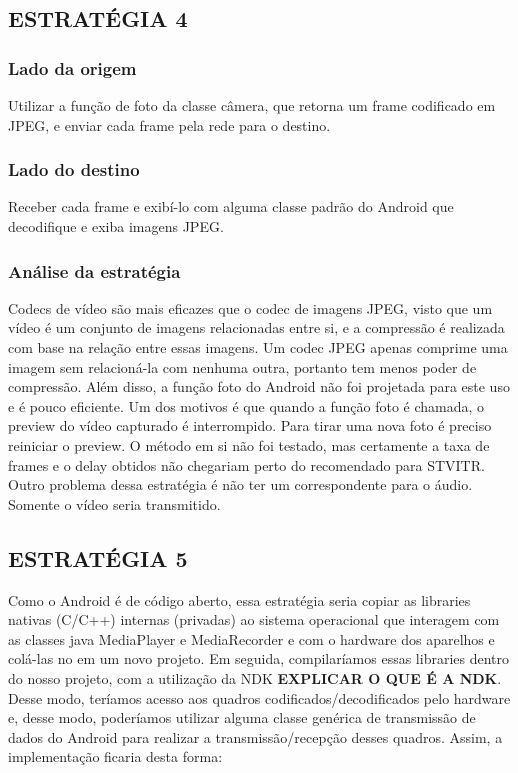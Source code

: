 \documentclass{acm_proc_article-sp}
\newcommand{\todo}[1]{\textcolor[rgb]{1.00,0.00,0.00}{\bf \uppercase{#1}}}
\begin{document}
\subsection{ESTRATÉGIA 4}

\subsubsection{Lado da origem}

Utilizar a função de foto da classe câmera, que retorna um frame codificado em JPEG, e enviar cada frame pela rede para o destino.

\subsubsection{Lado do destino}

Receber cada frame e exibí-lo com alguma classe padrão do Android que decodifique e exiba imagens JPEG.

\subsubsection{Análise da estratégia}

Codecs de vídeo são mais eficazes que o codec de imagens JPEG, visto que um vídeo é um conjunto de imagens relacionadas entre si, e a compressão é realizada com base na relação entre essas imagens. Um codec JPEG apenas comprime uma imagem sem relacioná-la com nenhuma outra, portanto tem menos poder de compressão. Além disso, a função foto do Android não foi projetada para este uso e é pouco eficiente. Um dos motivos é que quando a função foto é chamada, o preview do vídeo capturado é interrompido. Para tirar uma nova foto é preciso reiniciar o preview. O método em si não foi testado, mas certamente a taxa de frames e o delay obtidos não chegariam perto do recomendado para STVITR. Outro problema dessa estratégia é não ter um correspondente para o áudio. Somente o vídeo seria transmitido.

\subsection{ESTRATÉGIA 5}
Como o Android é de código aberto, essa estratégia seria copiar as libraries nativas (C/C++) internas (privadas) ao sistema operacional que interagem com as classes java MediaPlayer e MediaRecorder e com o hardware dos aparelhos e colá-las no em um novo projeto. Em seguida, compilaríamos essas libraries dentro do nosso projeto, com a utilização da NDK \todo{explicar o que é a ndk}. Desse modo, teríamos acesso aos quadros codificados/decodificados pelo hardware e, desse modo, poderíamos utilizar alguma classe genérica de transmissão de dados do Android para realizar a transmissão/recepção desses quadros. Assim, a implementação ficaria desta forma:
\end{document}
